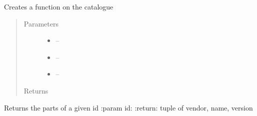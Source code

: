 \documentclass[letterpaper,10pt,english]{sphinxmanual}
\begin{document}

\begin{fulllineitems}
\label{_source/son_editor.impl:son_editor.impl.catalogue_servicesimpl.create_in_catalogue}
Creates a function on the catalogue
\begin{quote}\begin{description}
\item[{Parameters}] \leavevmode\begin{itemize}
\item {} 
 -- 

\item {} 
 -- 

\item {} 
 -- 

\end{itemize}

\item[{Returns}] \leavevmode


\end{description}\end{quote}

\end{fulllineitems}


\begin{fulllineitems}
\label{_source/son_editor.impl:son_editor.impl.catalogue_servicesimpl.decode_id}
Returns the parts of a given id
:param id:
:return: tuple of vendor, name, version

\end{fulllineitems}

\end{document}
